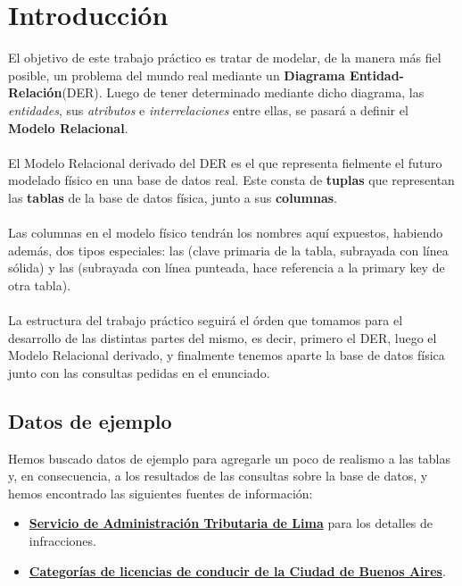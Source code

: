 \section{Introducción}
El objetivo de este trabajo práctico es tratar de modelar, de la manera más fiel posible, un problema del mundo real mediante un \textbf{Diagrama Entidad-Relación}(DER). Luego de tener determinado mediante dicho diagrama, las \textit{entidades}, sus \textit{atributos} e \textit{interrelaciones} entre ellas, se pasará a definir el \textbf{Modelo Relacional}.\\
\\
\indent El Modelo Relacional derivado del DER es el que representa fielmente el futuro modelado físico en una base de datos real. Este consta de \textbf{tuplas} que representan las \textbf{tablas} de la base de datos física, junto a sus \textbf{columnas}.\\
\\
\indent Las columnas en el modelo físico tendrán los nombres aquí expuestos, habiendo además, dos tipos especiales: las  (clave primaria de la tabla, subrayada con línea sólida) y las  (subrayada con línea punteada, hace referencia a la primary key de otra tabla).\\
\\
\indent La estructura del trabajo práctico seguirá el órden que tomamos para el desarrollo de las distintas partes del mismo, es decir, primero el DER, luego el Modelo Relacional derivado, y finalmente tenemos aparte la base de datos física junto con las consultas pedidas en el enunciado.

\subsection{Datos de ejemplo}
Hemos buscado datos de ejemplo para agregarle un poco de realismo a las tablas y, en consecuencia, a los resultados de las consultas sobre la base de datos, y hemos encontrado las siguientes fuentes de información:
\begin{itemize}
	\item \href{https://www.sat.gob.pe/websitev8/Modulos/contenidos/mult_Papeletas_ti_rnt.aspx}{\textbf{Servicio de Administración Tributaria de Lima}} para los detalles de infracciones.
	\item \href{http://www.buenosaires.gob.ar/areas/obr_publicas/lic_conducir/categorias.php?menu_id=6427}{\textbf{Categorías de licencias de conducir de la Ciudad de Buenos Aires}}.
\end{itemize}